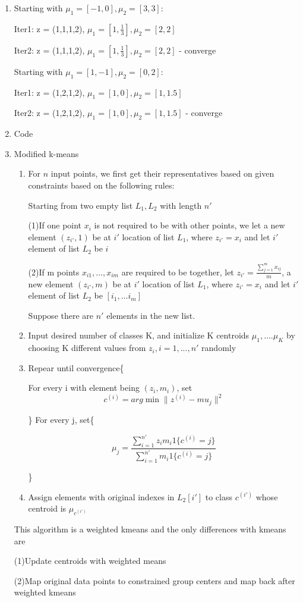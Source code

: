 \documentclass[12pt]{article}
\begin{document}
\begin{enumerate}[label=(\alph*)]
  \item Starting with $\mu_1 = [-1,0], \mu_2 = [3,3]$:
  
  Iter1: z = (1,1,1,2), $\mu_1 = [1,\frac{1}{3}], \mu_2 = [2,2]$
  
  Iter2: z = (1,1,1,2), $\mu_1 = [1,\frac{1}{3}], \mu_2 = [2,2]$ - converge
  
  Starting with $\mu_1 = [1,-1], \mu_2 = [0,2]$:
  
  Iter1: z = (1,2,1,2), $\mu_1 = [1,0], \mu_2 = [1,1.5]$
  
  Iter2: z = (1,2,1,2), $\mu_1 = [1,0], \mu_2 = [1,1.5]$ - converge
  \item Code
  \item Modified k-means
  \begin{algorithm}
  \begin{enumerate}
  \item For $n$ input points, we first get their representatives based on given constraints based on the following rules:
  
  Starting from two empty list $L_1, L_2$ with length $n'$
  
  (1)If one point $x_i$ is not required to be with other points, we  let a new element $(z_{i'},1)$  be at $i'$ location of list $L_1$, where $z_{i'} = x_i$ and let $i'$ element of list $L_2$ be $i$
  
  (2)If m points $x_{i1},\ldots, x_{im}$ are required to be together, let $z_{i'} = \frac{\sum^m_{j=1}x_{ij}}{m}$, a new element $(z_{i'},m)$  be at $i'$ location of list $L_1$, where $z_{i'} = x_i$ and let $i'$ element of list $L_2$ be $[i_1,\ldots i_m]$
  
  Suppose there are $n'$ elements in the new list.
  \item Input desired number of classes K, and initialize K centroids $\mu_1,\ldots.\mu_K$ by choosing K different values from $z_i, i = 1,...,n'$ randomly
  \item Repear until convergence\{
  
  For every i with element being $(z_i, m_i)$, set
  \[
  c^{(i)} = arg\min \|z^{(i)}-mu_j\|^2
  \]
 
   \} 
  For every j, set\{
  
  \[\mu_j = \frac{\sum^{n'}_{i=1} z_im_i 1\{c^{(i)} =j\}}{\sum^{n'}_{i=1} m_i 1\{c^{(i)} = j\}}\]
  
  \}
  \item Assign elements with original indexes in $L_2[i']$ to class $c^{(i')}$ whose centroid is $\mu_{c^{(i')}}$
  \end{enumerate}
  \end{algorithm}
  This algorithm is a weighted kmeans and the only differences with kmeans are
  
  (1)Update centroids with weighted means
  
  (2)Map original data points to constrained group centers and map back after weighted kmeans
\end{enumerate}
\end{document}
